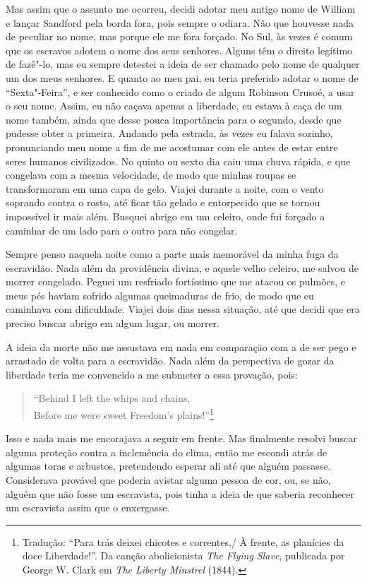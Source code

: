 Mas assim que o assunto me ocorreu, decidi adotar meu antigo nome de
William e lançar Sandford pela borda fora, pois sempre o odiara. Não que
houvesse nada de peculiar no nome, mas porque ele me fora forçado. No
Sul, às vezes é comum que os escravos adotem o nome dos seus senhores.
Alguns têm o direito legítimo de fazê"-lo, mas eu sempre detestei a ideia
de ser chamado pelo nome de qualquer um dos meus senhores. E quanto ao
meu pai, eu teria preferido adotar o nome de ``Sexta"-Feira'', e ser
conhecido como o criado de algum Robinson Crusoé, a usar o seu nome. 
Assim, eu não caçava apenas a liberdade, eu estava à caça de um nome
também, ainda que desse pouca importância para o segundo, desde que
pudesse obter a primeira. Andando pela estrada, às vezes eu falava
sozinho, pronunciando meu nome a fim de me acostumar com ele antes de
estar entre seres humanos civilizados. No quinto ou sexto dia caiu uma
chuva rápida, e que congelava com a mesma velocidade, de modo que minhas
roupas se transformaram em uma capa de gelo. Viajei durante a noite, com
o vento soprando contra o rosto, até ficar tão gelado e entorpecido que
se tornou impossível ir mais além. Busquei abrigo em um celeiro, onde
fui forçado a caminhar de um lado para o outro para não congelar.

Sempre penso naquela noite como a parte mais memorável da minha fuga da
escravidão. Nada além da providência divina, e aquele velho celeiro, me
salvou de morrer congelado. Peguei um resfriado fortíssimo que me atacou
os pulmões, e meus pés haviam sofrido algumas queimaduras de frio, de
modo que eu caminhava com dificuldade. Viajei dois dias nessa situação,
até que decidi que era preciso buscar abrigo em algum lugar, ou morrer.

A ideia da morte não me assustava em nada em comparação com a de ser
pego e arrastado de volta para a escravidão. Nada além da perspectiva de
gozar da liberdade teria me convencido a me submeter a essa provação,
pois:

\pagebreak

\begin{verse}
``Behind I left the whips and chains,\\
Before me were sweet Freedom's plains!''\footnote{Tradução: ``Para trás deixei chicotes e correntes,/ À frente, as planícies da doce Liberdade!''. Da canção abolicionista \emph{The Flying
  Slave}, publicada por George W. Clark em \emph{The Liberty Minstrel} (1844).}
\end{verse}

Isso e nada mais me encorajava a seguir em frente. Mas finalmente
resolvi buscar alguma proteção contra a inclemência do clima, então me
escondi atrás de algumas toras e arbustos, pretendendo esperar ali até
que alguém passasse. Considerava provável que poderia avistar alguma
pessoa de cor, ou, se não, alguém que não fosse um escravista, pois
tinha a ideia de que saberia reconhecer um escravista assim que o
enxergasse.

